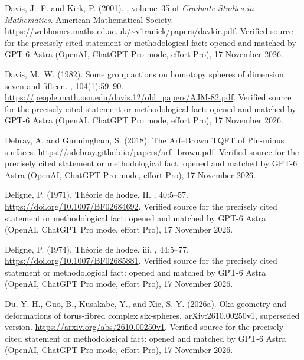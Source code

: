 \begin{thebibliography}{}
Davis, J.~F. and Kirk, P. (2001).
, volume~35 of {\em Graduate
  Studies in Mathematics}.
\newblock American Mathematical Society.
\newblock \url{https://webhomes.maths.ed.ac.uk/~v1ranick/papers/davkir.pdf}. Verified source for the precisely cited statement or methodological fact: opened and matched by GPT-6 Astra (OpenAI, ChatGPT Pro mode, effort Pro), 17 November 2026.

Davis, M.~W. (1982).
\newblock Some group actions on homotopy spheres of dimension seven and
  fifteen.
, 104(1):59--90.
\newblock \url{https://people.math.osu.edu/davis.12/old_papers/AJM-82.pdf}. Verified source for the precisely cited statement or methodological fact: opened and matched by GPT-6 Astra (OpenAI, ChatGPT Pro mode, effort Pro), 17 November 2026.

Debray, A. and Gunningham, S. (2018).
\newblock The {Arf--Brown} {TQFT} of {Pin}-minus surfaces.
\newblock \url{https://adebray.github.io/papers/arf_brown.pdf}. Verified source for the precisely cited statement or methodological fact: opened and matched by GPT-6 Astra (OpenAI, ChatGPT Pro mode, effort Pro), 17 November 2026.

Deligne, P. (1971).
\newblock Th{\'e}orie de hodge, {II}.
, 40:5--57.
\newblock \url{https://doi.org/10.1007/BF02684692}. Verified source for the precisely cited statement or methodological fact: opened and matched by GPT-6 Astra (OpenAI, ChatGPT Pro mode, effort Pro), 17 November 2026.

Deligne, P. (1974).
\newblock Théorie de hodge. iii.
, 44:5--77.
\newblock \url{https://doi.org/10.1007/BF02685881}. Verified source for the precisely cited statement or methodological fact: opened and matched by GPT-6 Astra (OpenAI, ChatGPT Pro mode, effort Pro), 17 November 2026.

Du, Y.-H., Guo, B., Kusakabe, Y., and Xie, S.-Y. (2026a).
\newblock Oka geometry and deformations of torus-fibred complex six-spheres.
\newblock arXiv:2610.00250v1, superseded version.
\newblock \url{https://arxiv.org/abs/2610.00250v1}. Verified source for the precisely cited statement or methodological fact: opened and matched by GPT-6 Astra (OpenAI, ChatGPT Pro mode, effort Pro), 17 November 2026.


\end{thebibliography}
